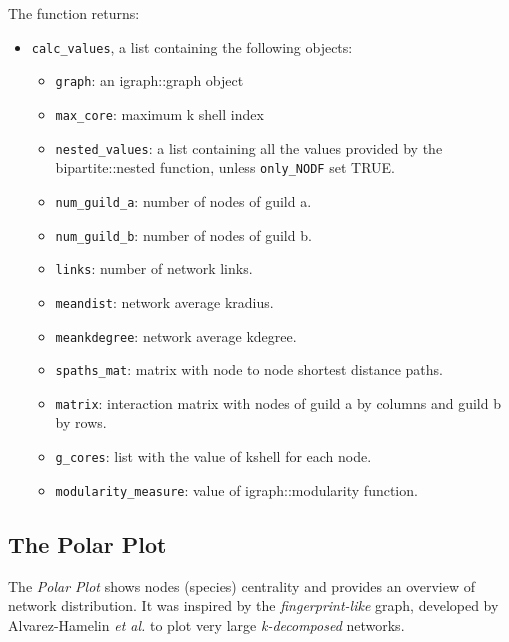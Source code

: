 \documentclass[12pt]{article}
\begin{document}
The function returns:
\begin{itemize}
\item \texttt{calc\_values}, a list containing the following objects:
   \begin{itemize}
   
\item \texttt{graph}: an igraph::graph object

\item \texttt{max\_core}: maximum k shell index

\item \texttt{nested\_values}: a list containing all the values provided by the bipartite::nested function, unless \texttt{only\_NODF} set TRUE.

\item \texttt{num\_guild\_a}: number of nodes of guild a.

\item \texttt{num\_guild\_b}: number of nodes of guild b.

\item \texttt{links}: number of network links.

\item \texttt{meandist}: network average kradius.

\item \texttt{meankdegree}: network average kdegree.

\item \texttt{spaths\_mat}: matrix with node to node shortest distance paths.

\item \texttt{matrix}: interaction matrix with nodes of guild a by columns and guild b by rows.

\item \texttt{g\_cores}: list with the value of kshell for each node.

\item \texttt{modularity\_measure}: value of igraph::modularity function.
   \end{itemize}


\end{itemize}

\clearpage
\subsection*{The Polar Plot}
\label{polar_plot}

The \textit{Polar Plot} shows nodes (species) centrality and provides an overview of network distribution. It was inspired by the \textit{fingerprint-like} graph, developed by Alvarez-Hamelin \textit{et al.} \cite{alvarez2005k} to plot very large \textit{k-decomposed} networks.
\end{document}

